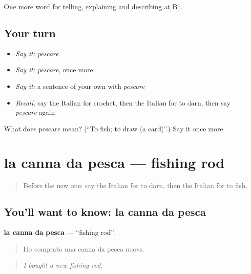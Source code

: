 \begin{grammarlens}[title={What you've built}]
One more word for telling, explaining and describing at B1.
\end{grammarlens}

\subsection*{Your turn}
\begin{itemize}
\raggedright
  \item \emph{Say it:} \emph{pescare}
  \item \emph{Say it:} \emph{pescare}, once more
  \item \emph{Say it:} a sentence of your own with \emph{pescare}
  \item \emph{Recall:} say the Italian for crochet, then the Italian for to darn, then say \emph{pescare} again
\end{itemize}

\begin{tcolorbox}[breakable,colback=teal!4,colframe=teal!35!black,title={Before you move on}]
What does pescare mean? (\textquotedblleft{}To fish; to draw (a card)\textquotedblright{}.) Say it once more.
\end{tcolorbox}
\section[la canna da pesca]{la canna da pesca — fishing rod}

\label{lesson:IT-C501-canna-da-pesca}



\begin{quote}
Before the new one: say the Italian for to darn, then the Italian for to fish.
\end{quote}

\subsection*{You'll want to know: la canna da pesca}
\textbf{la canna da pesca} — \textquotedblleft{}fishing rod\textquotedblright{}.

\begin{quote}
Ho comprato una canna da pesca nuova.
\end{quote}

\begin{quote}
\emph{I bought a new fishing rod.}
\end{quote}

